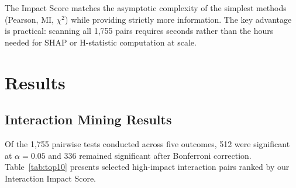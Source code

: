 \documentclass[conference]{IEEEtran}
\begin{document}
The Impact Score matches the asymptotic complexity of the simplest methods (Pearson, MI, $\chi^2$) while providing strictly more information. The key advantage is practical: scanning all 1,755 pairs requires seconds rather than the hours needed for SHAP or H-statistic computation at scale.
\section{Results}
\label{sec:results}

\subsection{Interaction Mining Results}

Of the 1,755 pairwise tests conducted across five outcomes, 512 were significant at $\alpha = 0.05$ and 336 remained significant after Bonferroni correction. Table~\ref{tab:top10} presents selected high-impact interaction pairs ranked by our Interaction Impact Score.

\begin{table}[htb]
\centering
\renewcommand{\arraystretch}{1.15}
\caption{Top 10 interaction discoveries ranked by Interaction Impact Score.}
\label{tab:top10}
\end{table}
\end{document}
